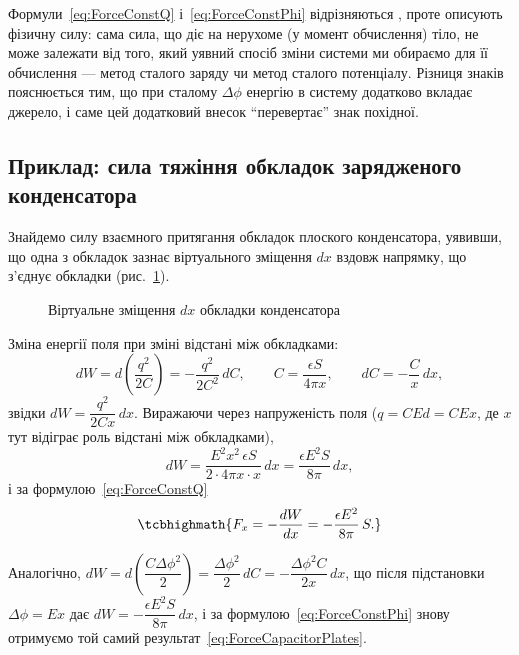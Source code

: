 \begin{Attention}
	Формули~\eqref{eq:ForceConstQ} і~\eqref{eq:ForceConstPhi} відрізняються , проте описують  фізичну силу: сама
	сила, що діє на нерухоме (у момент обчислення) тіло, не може залежати від того, який уявний спосіб зміни системи ми обираємо для її обчислення
	--- метод сталого заряду чи метод сталого потенціалу. Різниця знаків пояснюється тим, що при сталому $\Delta\phi$ енергію в систему додатково
	вкладає джерело, і саме цей додатковий внесок \enquote{перевертає} знак похідної.
\end{Attention}

\subsection*{Приклад: сила тяжіння обкладок зарядженого конденсатора}

Знайдемо силу взаємного притягання обкладок плоского конденсатора, уявивши, що одна з обкладок зазнає віртуального зміщення $dx$ вздовж напрямку,
що з'єднує обкладки (рис.~\ref{pic:VirtualDisplacement}).

\begin{figure}[h!]\centering
	\caption{Віртуальне зміщення $dx$ обкладки конденсатора\label{pic:VirtualDisplacement}}
\end{figure}

 Зміна енергії поля при зміні відстані між обкладками:
\begin{equation*}
	dW = d\left(\frac{q^2}{2C}\right) = -\frac{q^2}{2C^2}\, dC, \qquad C = \frac{\epsilon S}{4\pi x}, \qquad dC = -\frac{C}{x}\, dx,
\end{equation*}
звідки $dW = \dfrac{q^2}{2Cx}\, dx$. Виражаючи через напруженість поля ($q = CEd = C E x$, де $x$ тут відіграє роль відстані між обкладками),
\begin{equation*}
	dW = \frac{E^2 x^2\, \epsilon S}{2 \cdot 4\pi x \cdot x}\, dx = \frac{\epsilon E^2 S}{8\pi}\, dx,
\end{equation*}
і за формулою~\eqref{eq:ForceConstQ}
\begin{equation}\label{eq:ForceCapacitorPlates}
	\tcbhighmath{
		F_x = -\frac{dW}{dx} = -\frac{\epsilon E^2}{8\pi}\, S.
	}
\end{equation}

 Аналогічно, $dW = d\left(\dfrac{C\Delta\phi^2}{2}\right) = \dfrac{\Delta\phi^2}{2}\, dC =
-\dfrac{\Delta\phi^2 C}{2x}\, dx$, що після підстановки $\Delta\phi = Ex$ дає $dW = -\dfrac{\epsilon E^2 S}{8\pi}\, dx$, і за
формулою~\eqref{eq:ForceConstPhi} знову отримуємо той самий результат~\eqref{eq:ForceCapacitorPlates}.

